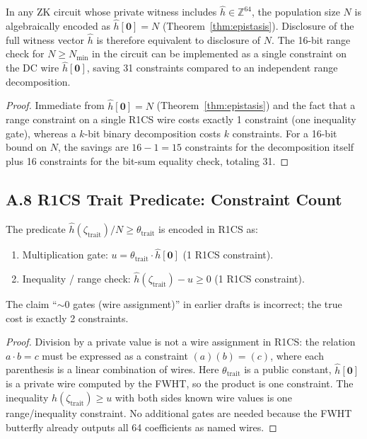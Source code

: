 \documentclass[11pt]{article}
\begin{document}
\begin{lemma}\label{lem:dc}
In any ZK circuit whose private witness includes $\hat{h} \in \mathbb{Z}^{64}$,
the population size $N$ is algebraically encoded as $\hat{h}[\bm{0}] = N$
(Theorem~\ref{thm:epistasis}).  Disclosure of the full witness vector
$\hat{h}$ is therefore equivalent to disclosure of $N$.
The 16-bit range check for $N \ge N_{\min}$ in the circuit can be
implemented as a single constraint on the DC wire $\hat{h}[\bm{0}]$,
saving 31 constraints compared to an independent range decomposition.
\end{lemma}

\begin{proof}
Immediate from $\hat{h}[\bm{0}] = N$ (Theorem~\ref{thm:epistasis}) and
the fact that a range constraint on a single R1CS wire costs exactly
1 constraint (one inequality gate), whereas a $k$-bit binary decomposition
costs $k$ constraints.  For a 16-bit bound on $N$, the savings are $16-1=15$
constraints for the decomposition itself plus 16 constraints for the
bit-sum equality check, totaling 31.
\end{proof}

\subsection*{A.8 \quad R1CS Trait Predicate: Constraint Count}

\begin{lemma}\label{lem:trait}
The predicate $\hat{h}(\zeta_{\text{trait}})/N \ge \theta_{\text{trait}}$
is encoded in R1CS as:
\begin{enumerate}[nosep]
  \item Multiplication gate: $u = \theta_{\text{trait}} \cdot \hat{h}[\bm{0}]$
        (1 R1CS constraint).
  \item Inequality / range check: $\hat{h}(\zeta_{\text{trait}}) - u \ge 0$
        (1 R1CS constraint).
\end{enumerate}
The claim ``$\sim 0$ gates (wire assignment)'' in earlier drafts is
incorrect; the true cost is exactly 2 constraints.
\end{lemma}

\begin{proof}
Division by a private value is not a wire assignment in R1CS: the
relation $a \cdot b = c$ must be expressed as a constraint $(a)(b) = (c)$,
where each parenthesis is a linear combination of wires.  Here
$\theta_{\text{trait}}$ is a public constant, $\hat{h}[\bm{0}]$ is a
private wire computed by the FWHT, so the product is one constraint.
The inequality $\hat{h}(\zeta_{\text{trait}}) \ge u$ with both sides
known wire values is one range/inequality constraint.  No additional
gates are needed because the FWHT butterfly already outputs all 64
coefficients as named wires.
\end{proof}
\end{document}
